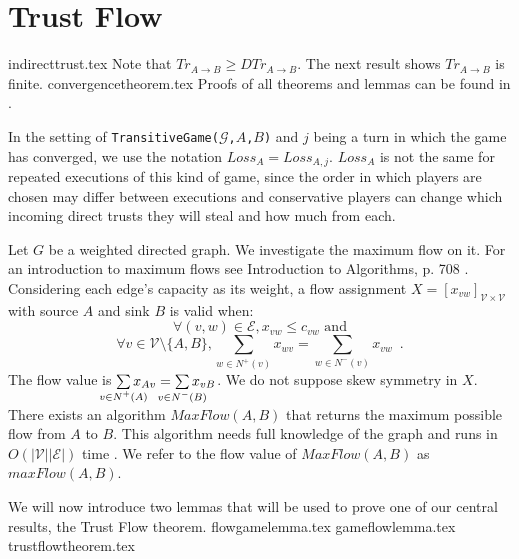 \section{Trust Flow}
  {indirecttrust.tex}
  \noindent Note that $Tr_{A \rightarrow B} \geq DTr_{A \rightarrow B}$. The next result shows $Tr_{A \rightarrow B}$ is
  finite.
  {convergencetheorem.tex}
  Proofs of all theorems and lemmas can be found in \cite{trustisrisk}.

  In the setting of \texttt{TransitiveGame(}$\mathcal{G}$\texttt{,}$A$\texttt{,}$B$\texttt{)} and $j$ being a turn in which
  the game has converged, we use the notation $Loss_A = Loss_{A, j}$. $Loss_A$ is not the same for repeated executions of this
  kind of game, since the order in which players are chosen may differ between executions and conservative players can change
  which incoming direct trusts they will steal and how much from each.

  Let $G$ be a weighted directed graph. We investigate the maximum flow on it. For an introduction to maximum
  flows see Introduction to Algorithms, p. 708 \cite{clrs}. Considering each edge's capacity as its weight, a flow
  assignment $X = [x_{vw}]_{\mathcal{V} \times \mathcal{V}}$ with source $A$ and sink $B$ is valid when:
  \begin{equation}
  \label{flow1}
    \forall (v, w) \in \mathcal{E}, x_{vw} \leq c_{vw} \mbox{ and}
  \end{equation}
  \begin{equation}
  \label{flow2}
    \forall v \in \mathcal{V} \setminus \{A,B\}, \sum\limits_{w \in N^{+}(v)}x_{wv} = \sum\limits_{w \in N^{-}(v)}x_{vw}
    \enspace.
  \end{equation}
  The flow value is $\sum\limits_{\mathclap{v \in N^{+}\left(A\right)}}x_{Av} = \sum\limits_{\mathclap{v \in
  N^{-}\left(B\right)}}x_{vB}$. We do not suppose skew symmetry in $X$. There exists an algorithm $MaxFlow\left(A, B\right)$
  that returns the maximum possible flow from $A$ to $B$.  This algorithm needs full knowledge of the graph and runs in
  $O\left(|\mathcal{V}||\mathcal{E}|\right)$ time \cite{maxflownm}. We refer to the flow value of $MaxFlow\left(A, B\right)$
  as $maxFlow\left(A, B\right)$.

  We will now introduce two lemmas that will be used to prove one of our central results, the Trust Flow theorem.
  {flowgamelemma.tex}
  {gameflowlemma.tex}
  {trustflowtheorem.tex}

